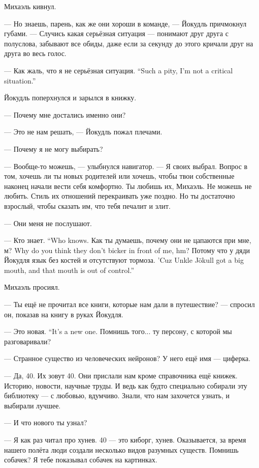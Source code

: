 Михаэль кивнул.

--- Но знаешь, парень, как же они хороши в команде, --- Йокудль причмокнул губами.
--- Случись какая серьёзная ситуация --- понимают друг друга с полуслова, забывают все обиды, даже если за секунду до этого кричали друг на друга во весь голос.

{--- Как жаль, что я не серьёзная ситуация.}
{``Such a pity, I'm not a critical situation.''}

Йокудль поперхнулся и зарылся в книжку.

--- Почему мне достались именно они?

--- Это не нам решать, --- Йокудль пожал плечами.

--- Почему я не могу выбирать?

--- Вообще-то можешь, --- улыбнулся навигатор.
--- Я своих выбрал.
Вопрос в том, хочешь ли ты новых родителей или хочешь, чтобы твои собственные наконец начали вести себя комфортно.
Ты любишь их, Михаэль.
Не можешь не любить.
Стиль их отношений перекраивать уже поздно.
Но ты достаточно взрослый, чтобы сказать им, что тебя печалит и злит.

--- Они меня не послушают.

{--- Кто знает.}
{``Who knows.}
{Как ты думаешь, почему они не цапаются при мне, м?}
{Why do you think they don't bicker in front of me, hm?}
{Потому что у дяди Йокудля язык без костей и отсутствуют тормоза.}
{'Cuz Unkle Jökull got a big mouth, and that mouth is out of control.''}

Михаэль просиял.

--- Ты ещё не прочитал все книги, которые нам дали в путешествие? --- спросил он, показав на книгу в руках Йокудля.

{--- Это новая.}
{``It's a new one.}
Помнишь того... ту персону, с которой мы разговаривали?

--- Странное существо из человеческих нейронов?
У него ещё имя --- циферка.

--- Да, 40.
Их зовут 40.
Они прислали нам кроме справочника ещё книжек.
Историю, новости, научные труды.
И ведь как будто специально собирали эту библиотеку --- с любовью, вдумчиво.
Знали, что нам захочется узнать, и выбирали лучшее.

--- И что нового ты узнал?

--- Я как раз читал про хунев.
40 --- это киборг, хунев.
Оказывается, за время нашего полёта люди создали несколько видов разумных существ.
Помнишь собачек?
Я тебе показывал собачек на картинках.

